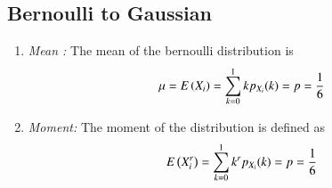 \renewcommand{\thefigure}{\theenumi}
\renewcommand{\thetable}{\theenumi}

\subsection{Bernoulli to Gaussian}
\begin{enumerate}[label=\thesubsection.\arabic*
,ref=\thesection.\theenumi]


\item {\em Mean :}  The mean of the bernoulli distribution is 
\begin{align}
\mu = E\left(X_i\right)  = \sum_{k=0}^{1}kp_{X_i}(k) = p = \frac{1}{6}
\end{align}
\item {\em Moment:}  The moment of the distribution is defined as
\begin{align}
E\left(X_i^r\right)  = \sum_{k=0}^{1}k^rp_{X_i}(k) = p = \frac{1}{6}
\end{align}


\end{enumerate}
